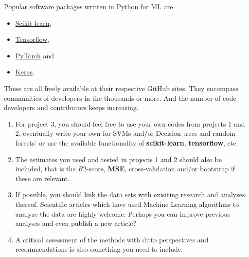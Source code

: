 \documentclass[%
oneside,                 %
final,                   %
10pt]{article}
\begin{document}
\noindent
Popular software packages written in Python for ML are

\begin{itemize}
\item \href{{http://scikit-learn.org/stable/}}{Scikit-learn}, 

\item \href{{https://www.tensorflow.org/}}{Tensorflow},

\item \href{{http://pytorch.org/}}{PyTorch} and 

\item \href{{https://keras.io/}}{Keras}.
\end{itemize}

\noindent
These are all freely available at their respective GitHub sites. They 
encompass communities of developers in the thousands or more. And the number
of code developers and contributors keeps increasing.
















\begin{enumerate}
\item For project 3, you should feel free to use your own codes from projects 1 and 2, eventually write your own for SVMs and/or Decision trees and random forests' or use the available functionality of \textbf{scikit-learn}, \textbf{tensorflow}, etc. 

\item The estimates you used and tested in projects 1 and 2 should also be included, that is the $R2$-score, \textbf{MSE}, cross-validation and/or bootstrap if these are relevant. 

\item If possible, you should link the data sets with exisiting research and analyses thereof. Scientific articles which have used Machine Learning algorithms to analyze the data are highly welcome. Perhaps you can improve previous analyses and even publish a new article? 

\item A critical assessment of the methods with ditto perspectives and recommendations is also something you need to include.
\end{enumerate}

\noindent

\end{document}
